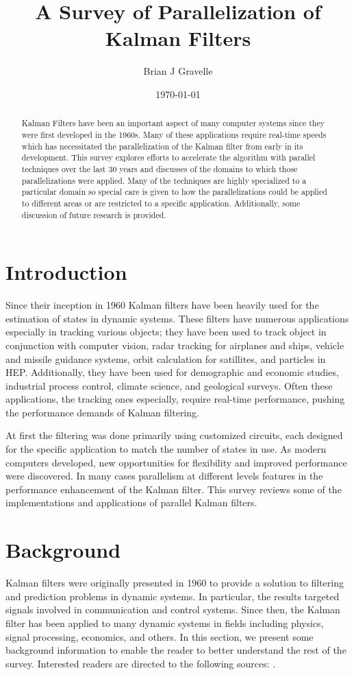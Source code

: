\documentclass[11pt]{article}
\title{A Survey of Parallelization of Kalman Filters}
\author{
       Brian J Gravelle 
}
\date{\today}
\begin{document}
\maketitle

\begin{abstract}
Kalman Filters have been an important aspect of many computer systems since they were first developed in the 1960s. Many of these applications require real-time speeds which has necessitated the parallelization of the Kalman filter from early in its development. This survey explores efforts to accelerate the algorithm with parallel techniques over the last 30 years  and discusses of the domains to which those parallelizations were applied. Many of the techniques are highly specialized to a particular domain so special care is given to how the parallelizations could be applied to different areas or are restricted to a specific application. Additionally, some discussion of future research is provided.
\end{abstract}

\section{Introduction}
Since their inception in 1960 Kalman filters have been heavily used for the estimation of states in dynamic systems. These filters have numerous applications especially in tracking various objects; they have been used to track object in conjunction with computer vision, radar tracking for airplanes and ships, vehicle and missile guidance systems, orbit calculation for satillites, and particles in HEP. Additionally, they have been used for demographic and economic studies, industrial process control, climate science, and geological surveys. Often these applications, the tracking ones especially, require real-time performance, pushing the performance demands of Kalman filtering.

At first the filtering was done primarily using customized circuits, each designed for the specific application to match the number of states in use. As modern computers developed, new opportunities for flexibility and improved performance were discovered. In many cases parallelism at different levels features in the performance enhancement of the Kalman filter. This survey reviews some of the implementations and applications of parallel Kalman filters.


\section{Background}
Kalman filters \cite{kalman1960new} were originally presented in 1960 to provide a solution to filtering and prediction problems in dynamic systems. In particular, the results targeted signals involved in communication and control systems. Since then, the Kalman filter has been applied to many dynamic systems in fields including physics, signal processing, economics, and others. In this section, we present some background information to enable the reader to better understand the rest of the survey. Interested readers are directed to the following sources: \cite{blackman1986multiple, welch1995introduction, budhiraja2007survey, kalman1960new}.
\end{document}
